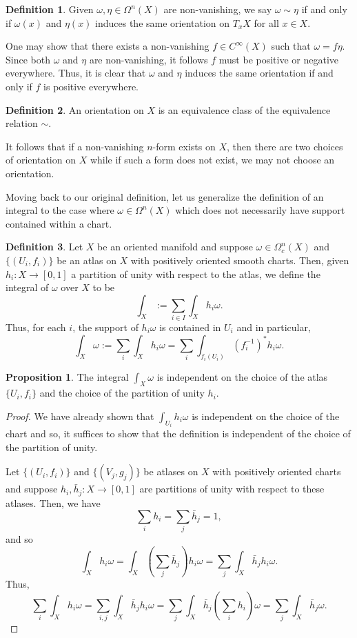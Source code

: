 \documentclass[]{article}
\theoremstyle{definition}
\theoremstyle{definition}
\newtheorem{definition}{Definition}[section]
\newtheorem{proposition}{Proposition}[section]
\begin{document}
\begin{definition}
  Given \(\omega, \eta \in \Omega^n(X)\) are non-vanishing, we say 
  \(\omega \sim \eta\) if and only if \(\omega(x)\) and \(\eta(x)\) induces 
  the same orientation on \(T_x X\) for all \(x \in X\). 
\end{definition}

One may show that there exists a non-vanishing \(f \in C^\infty(X)\) such that 
\(\omega = f\eta\). Since both \(\omega\) and \(\eta\) are non-vanishing, it 
follows \(f\) must be positive or negative everywhere. Thus, it is clear that 
\(\omega\) and \(\eta\) induces the same orientation if and only if \(f\) is 
positive everywhere. 

\begin{definition}
  An orientation on \(X\) is an equivalence class of the equivalence relation 
  \(\sim\).
\end{definition}

It follows that if a non-vanishing \(n\)-form exists on \(X\), then there 
are two choices of orientation on \(X\) while if such a form does not exist, 
we may not choose an orientation. 

Moving back to our original definition, let us generalize the definition of an 
integral to the case where \(\omega \in \Omega^n(X)\) which does not necessarily 
have support contained within a chart.

\begin{definition}
  Let \(X\) be an oriented manifold and suppose \(\omega \in \Omega^n_c(X)\) and 
  \(\{(U_i, f_i)\}\) be an atlas on \(X\) with positively oriented smooth charts. 
  Then, given \(h_i : X \to [0, 1]\) a partition of unity with respect to the 
  atlas, we define the integral of \(\omega\) over \(X\) to be 
  \[\int_X := \sum_{i \in I} \int_X h_i \omega.\]
  Thus, for each \(i\), the support of \(h_i\omega\) is contained in \(U_i\) 
  and in particular, 
  \[\int_X \omega := \sum_i \int_X h_i \omega = \sum_i \int_{f_i(U_i)} (f_i^{-1})^* h_i \omega.\]
\end{definition}

\begin{proposition}
  The integral \(\int_X \omega\) is independent on the choice of the atlas 
  \(\{U_i, f_i\}\) and the choice of the partition of unity \(h_i\).
\end{proposition}
\begin{proof}
  We have already shown that \(\int_{U_i} h_i\omega\) is independent on the 
  choice of the chart and so, it suffices to show that the definition is 
  independent of the choice of the partition of unity.

  Let \(\{(U_i, f_i)\}\) and \(\{(V_j, g_j)\}\) be atlases on \(X\) with 
  positively oriented charts and suppose \(h_i, \bar h_j : X \to [0, 1]\) are 
  partitions of unity with respect to these atlases. Then, we have 
  \[\sum_i h_i = \sum_j \bar h_j = 1,\]
  and so 
  \[\int_X h_i \omega = \int_X \left(\sum_j \bar h_j\right) h_i \omega = 
  \sum_j \int_X \bar h_j h_i \omega.\]
  Thus, 
  \[\sum_i \int_X h_i \omega = \sum_{i, j}\int_X \bar h_j h_i \omega = 
  \sum_j \int_X \bar h_j \left(\sum_i h_i\right)\omega = \sum_j \int_X \bar h_j \omega.\]
\end{proof}
\end{document}
